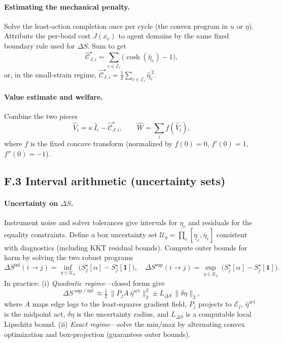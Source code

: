 \documentclass[11pt]{article}
\begin{document}
\paragraph{Estimating the mechanical penalty.}
Solve the least‑action completion once per cycle (the convex program in $u$ or $\eta$). Attribute the per‑bond cost $J(x_e)$ to agent domains by the same fixed boundary rule used for $\Delta S$. Sum to get
\[
\widehat{\mathcal{C}}_{J,i}^\star=\sum_{e\in \mathcal{E}_i}\big(\cosh(\widehat{\eta}_e)-1\big),
\]
or, in the small‑strain regime, $\widehat{\mathcal{C}}_{J,i}^\star=\tfrac12\sum_{e\in \mathcal{E}_i} \widehat{\eta}_e^{\,2}$.

\paragraph{Value estimate and welfare.}
Combine the two pieces
\[
\widehat{V}_i=\kappa\,\widehat{I}_i-\widehat{\mathcal{C}}_{J,i}^\star,
\qquad
\widehat{W}=\sum_i f(\widehat{V}_i),
\]
where $f$ is the fixed concave transform (normalized by $f(0)=0$, $f'(0)=1$, $f''(0)=-1$).

\subsection*{F.3 Interval arithmetic (uncertainty sets)}

\paragraph{Uncertainty on $\Delta S$.}
Instrument noise and solver tolerances give intervals for $\eta_e$ and residuals for the equality constraints. Define a box uncertainty set $\mathcal{U}_\eta=\prod_e [\underline{\eta}_e,\overline{\eta}_e]$ consistent with diagnostics (including KKT residual bounds). Compute outer bounds for harm by solving the two robust programs
\[
\Delta S^{\inf}(i\!\to\! j)=\inf_{\eta\in \mathcal{U}_\eta}\ \Big(S_j^\star[\alpha]-S_j^\star[\mathbf{1}]\Big),\quad
\Delta S^{\sup}(i\!\to\! j)=\sup_{\eta\in \mathcal{U}_\eta}\ \Big(S_j^\star[\alpha]-S_j^\star[\mathbf{1}]\Big).
\]
In practice: (i) \emph{Quadratic regime}—closed forms give
\[
\Delta S^{\sup/\inf}\approx \tfrac12\,\|P_j A\,\bar{\eta}^{\text{act}}\|_2^2 \pm L_{\Delta S}\,\|\delta\eta\|_2,
\]
where $A$ maps edge logs to the least‑squares gradient field, $P_j$ projects to $\mathcal{E}_j$, $\bar{\eta}^{\text{act}}$ is the midpoint act, $\delta\eta$ is the uncertainty radius, and $L_{\Delta S}$ is a computable local Lipschitz bound. (ii) \emph{Exact regime}—solve the min/max by alternating convex optimization and box‑projection (guarantees outer bounds).
\end{document}
